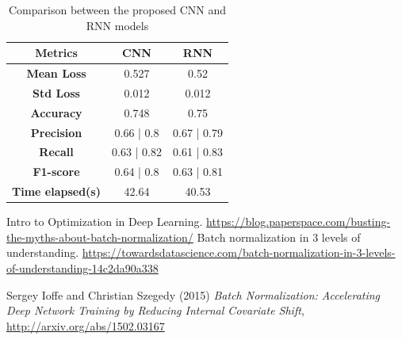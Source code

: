 \documentclass[a4paper]{article}
\begin{document}
\begin{table}[h]
	\centering
	\begin{tabular}{|c|c|c|}
		\hline
		\textbf{Metrics} & \textbf{CNN} & \textbf{RNN} \\
		\hline
		\textbf{Mean Loss} & 0.527 & 0.52 \\
		\hline
		\textbf{Std Loss} & 0.012 & 0.012 \\
		\hline
		\textbf{Accuracy} & 0.748 & 0.75 \\
		\hline
		\textbf{Precision} & 0.66 | 0.8 & 0.67 | 0.79 \\
		\hline
		\textbf{Recall} & 0.63 | 0.82 & 0.61 | 0.83 \\
		\hline
		\textbf{F1-score} & 0.64 | 0.8 & 0.63 | 0.81 \\
		\hline
		\textbf{Time elapsed(s)} & 42.64 & 40.53 \\
		\hline
	\end{tabular}
	\caption{Comparison between the proposed CNN and RNN models}
	\label{tab:comparison}
\end{table}

\newpage
\begin{thebibliography}{9}
Intro to Optimization in Deep Learning. \url{https://blog.paperspace.com/busting-the-myths-about-batch-normalization/}
Batch normalization in 3 levels of understanding. \url{https://towardsdatascience.com/batch-normalization-in-3-levels-of-understanding-14c2da90a338}

Sergey Ioffe and Christian Szegedy (2015) \emph{Batch Normalization: Accelerating Deep Network Training by Reducing Internal Covariate Shift}, \url{http://arxiv.org/abs/1502.03167}

\end{thebibliography}
\end{document}
